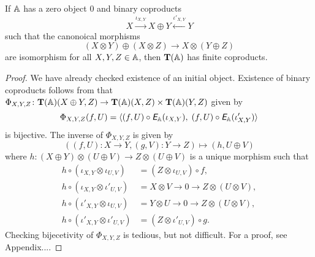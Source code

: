 \begin{proposition}\label{prop:biproduct}
  If $\mathbb{A}$ has a zero object $0$ and binary coproducts
  \begin{equation*}
    X \xrightarrow{\iota_{X,Y}} X \oplus Y \xleftarrow{\iota'_{X,Y}} Y
  \end{equation*}
  such that the canonoical morphisms
  \begin{equation*}
    (X \otimes Y) \oplus (X \otimes Z) \longrightarrow X \otimes (Y \oplus Z)
  \end{equation*}
  are isomorphism for all $X,Y,Z \in \mathbb{A}$, then
  $\mathbf T(\mathbb{A})$ has finite coproducts.
\end{proposition}
\begin{proof}
  We have already checked existence of an initial object. Existence of
  binary coproducts follows from that $\Phi_{X,Y,Z} \colon \mathbf T(\mathbb{A})(X \oplus Y,Z) \to
  \mathbf T(\mathbb{A})(X,Z) \times \mathbf T(\mathbb{A})(Y,Z)$ given by
  \begin{equation*}
    \Phi_{X,Y,Z}(f,U) =
    \langle (f,U) \circ \textit{\textsf{E}}_{\mathbb{A}}(\iota_{X,Y}),\; (f,U) \circ \textit{\textsf{E}}_{\mathbb{A}}(\iota'_{X,Y}) \rangle
  \end{equation*}
  is bijective. The inverse of $\Phi_{X,Y,Z}$ is given by
  \begin{equation*}
    ((f,U) \colon X \to Y ,(g,V) \colon Y \to Z) \longmapsto (h,U \oplus V)
  \end{equation*}
  where $h \colon (X \oplus Y) \otimes (U \oplus V) \to Z \otimes (U \oplus V)$
  is a unique morphism such that
  \begin{align*}
    h \circ (\iota_{X,Y} \otimes \iota_{U,V})
    &= (Z \otimes \iota_{U,V}) \circ f, \\
    h \circ (\iota_{X,Y} \otimes \iota'_{U,V})
    &= X \otimes V \longrightarrow 0 \longrightarrow Z \otimes (U \otimes V), \\
    h \circ (\iota'_{X,Y} \otimes \iota_{U,V})
    &= Y \otimes U \longrightarrow 0 \longrightarrow Z \otimes (U \otimes V), \\
    h \circ (\iota'_{X,Y} \otimes \iota'_{U,V})
    &= (Z \otimes \iota'_{U,V}) \circ g.
  \end{align*}
  Checking bijecetivity of $\Phi_{X,Y,Z}$ is tedious, but not difficult. For a proof,
  see Appendix....
\end{proof}

